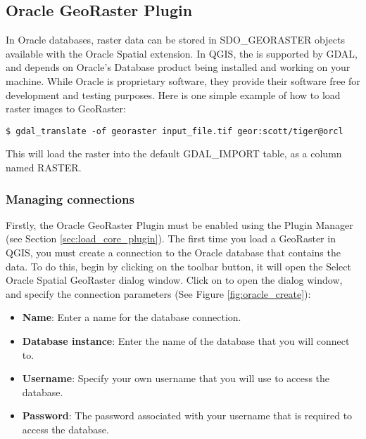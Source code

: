 
\subsection{Oracle GeoRaster Plugin}


In Oracle databases, raster data can be stored in SDO\_GEORASTER objects available with the 
Oracle Spatial extension. In QGIS, the  
is supported by GDAL, and depends on Oracle's Database product being installed and working 
on your machine. While Oracle is proprietary software, they provide their software free for 
development and testing purposes. Here is one simple example of how to load raster images 
to GeoRaster:

\begin{verbatim} 
$ gdal_translate -of georaster input_file.tif geor:scott/tiger@orcl
\end{verbatim}

This will load the raster into the default GDAL\_IMPORT table, as a column named RASTER.

\subsubsection{Managing connections}

Firstly, the Oracle GeoRaster Plugin must be enabled using the Plugin Manager (see Section 
\ref{sec:load_core_plugin}). The first time you load a GeoRaster in QGIS, you must create a 
connection to the Oracle database that contains the data. To do this, begin by clicking on 
the  toolbar button, it will open the Select Oracle 
Spatial GeoRaster dialog window. Click on  to open the dialog window, and specify 
the connection parameters (See Figure \ref{fig:oracle_create}):

\begin{itemize}
\item \textbf{Name}: Enter a name for the database connection.
\item \textbf{Database instance}: Enter the name of the database that you will connect to.
\item \textbf{Username}: Specify your own username that you will use to access the database.
\item \textbf{Password}: The password associated with your username that is required to access the database.
\end{itemize}

